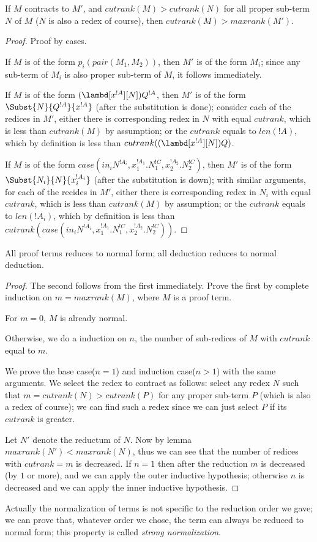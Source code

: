 \documentclass[../../../include/open-logic-section]{subfiles}
\begin{document}
\begin{lem}
  If $M$ contracts to $M'$, and $cutrank(M) > cutrank(N)$ for all 
  proper sub-term $N$ of $M$ ($N$ is also a redex of course), then
  $cutrank(M) > maxrank(M')$.
\end{lem}
\begin{proof}
  Proof by cases.

  If $M$ is of the form $p_i(pair(M_1, M_2))$, then $M'$ is of the
  form $M_i$; since any sub-term of $M_i$ is also proper sub-term of $M$,
  it follows immediately.

  If $M$ is of the form $(\lambd[x^{!A}][N])Q^{!A}$, then $M'$ is of the form
  $\Subst{N}{Q^{!A}}{x^{!A}}$ (after the substitution is done); consider each of
  the redices in $M'$, either there is corresponding redex in $N$ with
  equal $cutrank$, which is less than $cutrank(M)$ by assumption; or the $cutrank$ equals to $len(!A)$, which by
  definition is less than $cutrank((\lambd[x^{!A}][N])Q)$.

  If $M$ is of the form $case(in_i N^{!A_i}, x_1^{!A_1}.N_1^{!C}, x_2^{!A_2}.N_2^{!C})$, then $M'$ is
  of the form $\Subst{N_i}{N}{x_i^{!A_i}}$ (after the substitution is
  down); with similar arguments, for each of the recides in $M'$,
  either there is corresponding redex in $N_i$ with equal $cutrank$,
  which is less than $cutrank(M)$ by assumption; or the $cutrank$
  equals to $len(!A_i)$, which by definition is less than
  $cutrank(case(in_i N^{!A_i}, x_1^{!A_1}.N_1^{!C},
  x_2^{!A_2}.N_2^{!C}))$.
\end{proof}

\begin{thm}
  All proof terms reduces to normal form; all deduction reduces to
  normal deduction.
\end{thm}
\begin{proof}
  The second follows from the first immediately. Prove the first by
  complete induction on $m=maxrank(M)$, where $M$ is a proof term.

  For $m=0$, $M$ is already normal.

  Otherwise, we do a induction on $n$, the number of sub-redices of
  $M$ with $cutrank$ equal to $m$.

  We prove the base case($n=1$) and induction case($n>1$) with the same
  arguments. We select the redex to contract as follows: select any
  redex $N$ such that $m = cutrank(N) > cutrank(P)$ for any proper
  sub-term $P$ (which is also a redex of course); we can find such a redex since we can just select $P$
  if its $cutrank$ is greater.

  Let $N'$ denote the reductum of $N$. Now by lemma $maxrank(N') <
  maxrank(N)$, thus we can see that the number of redices with
  $cutrank=m$ is decreased. If $n=1$ then after the reduction $m$ is
  decreased (by $1$ or more), and we can apply the outer inductive hypothesis;
  otherwise $n$ is decreased and we can apply the inner inductive
  hypothesis.
\end{proof}

Actually the normalization of terms is not specific to the reduction
order we gave; we can prove that, whatever order we chose, the term
can always be reduced to normal form; this property is called
\emph{strong normalization}.
\end{document}

